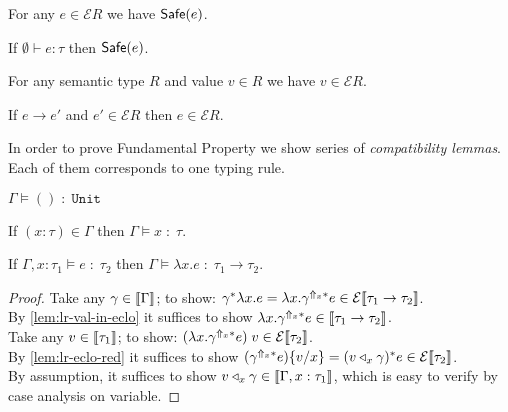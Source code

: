 \begin{theorem}[Adequacy]
  For any $e \in \mathcal{E}R$ we have $\mathsf{Safe}(e)$.
\end{theorem}

\begin{theorem}
  If $\emptyset \vdash e : \tau$ then $\mathsf{Safe}(e)$.
\end{theorem}

\begin{lemma}\label{lem:lr-val-in-eclo}
  For any semantic type $R$ and value $v \in R$
  we have $v \in \mathcal{E}R$.
\end{lemma}

\begin{lemma}\label{lem:lr-eclo-red}
  If $e \longrightarrow e'$ and $e' \in \mathcal{E}R$ then $e \in \mathcal{E}R$.
\end{lemma}

In order to prove Fundamental Property
we show series of \emph{compatibility lemmas}.
Each of them corresponds to one typing rule.

\begin{lemma}
  $\Gamma \models () \;:\; \mathtt{Unit}$
\end{lemma}

\begin{lemma}
  If $(x:\tau) \in \Gamma$ then
  $\Gamma \models x \;:\; \tau$.
\end{lemma}

\begin{lemma}
  If $\Gamma, x:\tau_1 \models e \;:\; \tau_2$
  then $\Gamma \models \lambda x.e \;:\; \tau_1 \to \tau_2$.
\end{lemma}
\begin{proof}
  Take any $\gamma \in \llbracket\Gamma\rrbracket$;
    to show: $\gamma^{*}\lambda x.e
      = \lambda x.\gamma^{\Uparrow_x*} e
      \in \mathcal{E}\llbracket\tau_1 \to \tau_2\rrbracket$.\\
  By \autoref{lem:lr-val-in-eclo} it suffices to show 
    $\lambda x.\gamma^{\Uparrow_x*} e
      \in \llbracket\tau_1 \to \tau_2\rrbracket$.\\
  Take any $v \in \llbracket\tau_1\rrbracket$;
    to show: $(\lambda x.\gamma^{\Uparrow_x*} e)\;v
      \in \mathcal{E}\llbracket\tau_2\rrbracket$. \\
  By \autoref{lem:lr-eclo-red} it suffices to show
    $(\gamma^{\Uparrow_x*} e)\{v/x\}
    = (v \triangleleft_x \gamma)^* e \in \mathcal{E}\llbracket\tau_2\rrbracket$. \\
  By assumption, it suffices to show
    $v \triangleleft_x \gamma \in \llbracket\Gamma, x : \tau_1\rrbracket$,
  which is easy to verify by case analysis on variable.
\end{proof}

